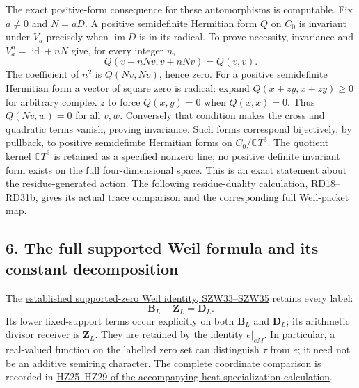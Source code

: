 \documentclass[
  10pt,
  a4paper,
]{article}
\begin{document}
The exact positive-form consequence for these automorphisms is
computable. Fix \(a\ne0\) and \(N=aD\). A positive semidefinite
Hermitian form \(Q\) on \(C_0\) is invariant under \(V_a\) precisely
when \(\operatorname{im}D\) is in its radical. To prove necessity,
invariance and \(V_a^n=\operatorname{id}+nN\) give, for every integer
\(n\), \[
Q(v+nNv,v+nNv)=Q(v,v).
\tag{ZH24}
\] The coefficient of \(n^2\) is \(Q(Nv,Nv)\), hence zero. For a
positive semidefinite Hermitian form a vector of square zero is radical:
expand \(Q(x+zy,x+zy)\ge0\) for arbitrary complex \(z\) to force
\(Q(x,y)=0\) when \(Q(x,x)=0\). Thus \(Q(Nv,w)=0\) for all \(v,w\).
Conversely that condition makes the cross and quadratic terms vanish,
proving invariance. Such forms correspond bijectively, by pullback, to
positive semidefinite Hermitian forms on \(C_0/\mathbb CT^3\). The
quotient kernel \(\mathbb CT^3\) is retained as a specified nonzero
line; no positive definite invariant form exists on the full
four-dimensional space. This is an exact statement about the
residue-generated action. The following
\href{COLLISION_RESIDUE_DUALITY_DERIVATION.md}{residue-duality
calculation, RD18--RD31b}, gives its actual trace comparison and the
corresponding full Weil-packet map.

\subsection{6. The full supported Weil formula and its constant
decomposition}\label{the-full-supported-weil-formula-and-its-constant-decomposition}

The
\href{https://github.com/KokunoYumeto/zeta-function-research-reader/blob/4a4238afc992e77aee83b97d38a1a63d283f540c/workbenches/splitzero-tandem/branches/tau-zero-prime-positivity/SUPPORTED_ZERO_PRIME_WEIL_DERIVATION.md\#L355}{established
supported-zero Weil identity, SZW33--SZW35} retains every label: \[
\boldsymbol B_L-\boldsymbol Z_L=\boldsymbol D_L.
\tag{ZH25}
\] Its lower fixed-support terms occur explicitly on both
\(\boldsymbol B_L\) and \(\boldsymbol D_L\); its arithmetic divisor
receiver is \(\boldsymbol Z_L\). They are retained by the identity
\(e|_{eM}\). In particular, a real-valued function on the labelled zero
set can distinguish \(\tau\) from \(e\); it need not be an additive
semiring character. The complete coordinate comparison is recorded in
\href{supporting_proofs/TAU_HEAT_ZERO_LOCALIZATION_DERIVATION.md}{HZ25--HZ29
of the accompanying heat-specialization calculation}.
\end{document}
